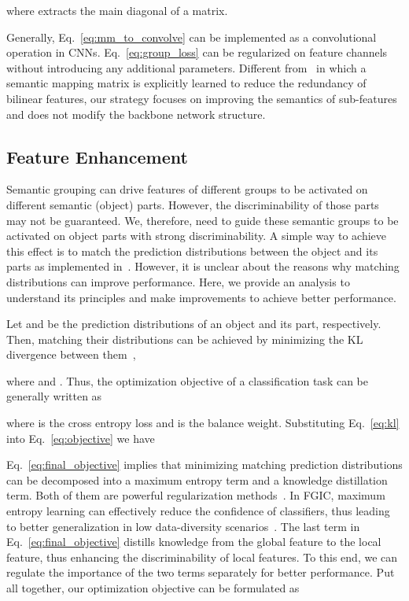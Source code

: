 \documentclass[journal]{IEEEtran}
\begin{document}
where  extracts the main diagonal of a matrix.

Generally, Eq.~\ref{eq:mm_to_convolve} can be implemented as a convolutional operation in CNNs. Eq.~\ref{eq:group_loss} can be regularized on feature channels without introducing any additional parameters.
Different from~\cite{dbtnet@19nips} in which a semantic mapping matrix is explicitly learned to reduce the redundancy of bilinear features, our strategy focuses on improving the semantics of sub-features and does not modify the backbone network structure. 

\subsection{Feature Enhancement}
\label{sec:enhance}
Semantic grouping can drive features of different groups to be activated on different semantic (object) parts. However, the discriminability of those parts may not be guaranteed. We, therefore, need to guide these semantic groups to be activated on object parts with strong discriminability. A simple way to achieve this effect is to match the prediction distributions between the object and its parts as implemented in~\cite{crossx@luowei}. However, it is unclear about the reasons why matching distributions can improve performance. Here, we provide an analysis to understand its principles and make improvements to achieve better performance.

Let  and  be the prediction distributions of an object and its part, respectively. Then, matching their distributions can be achieved by minimizing the KL divergence between them~\cite{crossx@luowei},

where  and . Thus, the optimization objective of a classification task can be generally written as

where  is the cross entropy loss and  is the balance weight. Substituting Eq.~\ref{eq:kl} into Eq.~\ref{eq:objective} we have

Eq.~\ref{eq:final_objective} implies that minimizing matching prediction distributions can be decomposed into a maximum entropy term and a knowledge distillation term. Both of them are powerful regularization methods~\cite{maximumentropy@cl,distill15hinton}. In FGIC, maximum entropy learning can effectively reduce the confidence of classifiers, thus leading to better generalization in low data-diversity scenarios~\cite{maxent@18nips}. 
The last term in Eq.~\ref{eq:final_objective} distills knowledge from the global feature to the local feature,  thus enhancing the discriminability of local features. To this end, we can regulate the importance of the two terms separately for better performance. Put all together, our optimization objective can be formulated as
\end{document}
